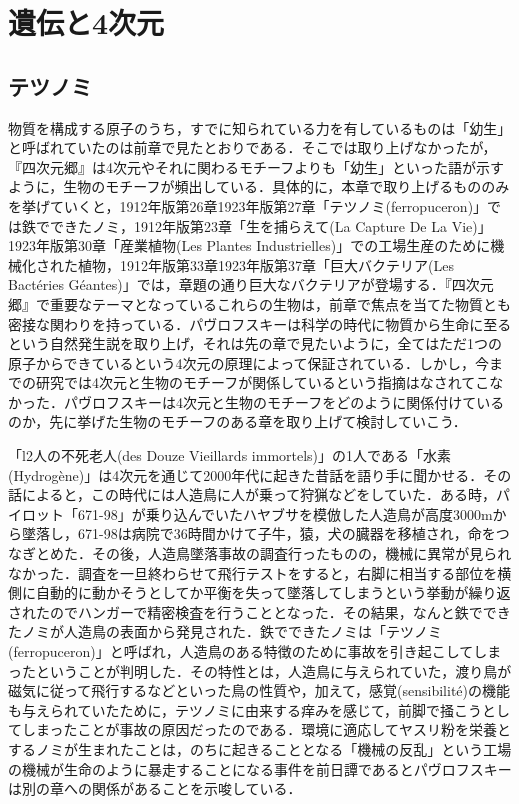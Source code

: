 \chapter{遺伝と4次元}
\section{テツノミ}
物質を構成する原子のうち，すでに知られている力を有しているものは「幼生」と呼ばれていたのは前章で見たとおりである．そこでは取り上げなかったが，『四次元郷』は4次元やそれに関わるモチーフよりも「幼生」といった語が示すように，生物のモチーフが頻出している．具体的に，本章で取り上げるもののみを挙げていくと，1912年版第26章1923年版第27章「テツノミ(ferropuceron)」では鉄でできたノミ，1912年版第23章「生を捕らえて(La Capture De La Vie)」1923年版第30章「産業植物(Les Plantes Industrielles)」での工場生産のために機械化された植物，1912年版第33章1923年版第37章「巨大バクテリア(Les Bactéries Géantes)」では，章題の通り巨大なバクテリアが登場する．『四次元郷』で重要なテーマとなっているこれらの生物は，前章で焦点を当てた物質とも密接な関わりを持っている．パヴロフスキーは科学の時代に物質から生命に至るという自然発生説を取り上げ，それは先の章で見たいように，全てはただ1つの原子からできているという4次元の原理によって保証されている．しかし，今までの研究では4次元と生物のモチーフが関係しているという指摘はなされてこなかった．パヴロフスキーは4次元と生物のモチーフをどのように関係付けているのか，先に挙げた生物のモチーフのある章を取り上げて検討していこう．

「l2人の不死老人(des Douze Vieillards immortels)」の1人である「水素(Hydrogène)」は4次元を通じて2000年代に起きた昔話を語り手に聞かせる．その話によると，この時代には人造鳥に人が乗って狩猟などをしていた．ある時，パイロット「671-98」が乗り込んでいたハヤブサを模倣した人造鳥が高度3000mから墜落し，671-98は病院で36時間かけて子牛，猿，犬の臓器を移植され，命をつなぎとめた．その後，人造鳥墜落事故の調査行ったものの，機械に異常が見られなかった．調査を一旦終わらせて飛行テストをすると，右脚に相当する部位を横側に自動的に動かそうとしてか平衡を失って墜落してしまうという挙動が繰り返されたのでハンガーで精密検査を行うこととなった．その結果，なんと鉄でできたノミが人造鳥の表面から発見された．鉄でできたノミは「テツノミ(ferropuceron)」と呼ばれ，人造鳥のある特徴のために事故を引き起こしてしまったということが判明した．その特性とは，人造鳥に与えられていた，渡り鳥が磁気に従って飛行するなどといった鳥の性質や，加えて，感覚(sensibilité)の機能も与えられていたために，テツノミに由来する痒みを感じて，前脚で掻こうとしてしまったことが事故の原因だったのである．環境に適応してヤスリ粉を栄養とするノミが生まれたことは，のちに起きることとなる「機械の反乱」という工場の機械が生命のように暴走することになる事件を前日譚であるとパヴロフスキーは別の章への関係があることを示唆している．

